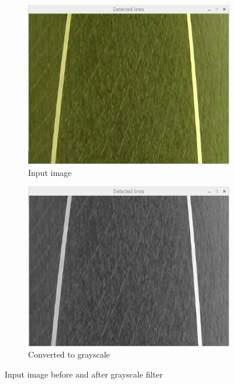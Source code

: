 \begin{figure}[H]
  \begin{subfigure}[b]{0.50\textwidth}
    \includegraphics[width=\textwidth]{./img/input22.png}
    \caption{\label{fig:input image}Input image}
  \end{subfigure}
  \begin{subfigure}[b]{0.50\textwidth}
    \includegraphics[width=\textwidth]{./img/gray22.png}
    \caption{\label{fig:gray image}Converted to grayscale}
  \end{subfigure}
  \caption{\label{fig:Input image and grayscale}Input image before and after grayscale filter}
\end{figure}


